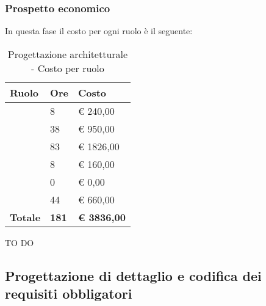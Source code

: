 		\subsubsection{Prospetto economico} %
		\label{ssub:prospetto_economico}
		In questa fase il costo per ogni ruolo è il seguente: \\
			\begin{table}[!h]
				\begin{center}
					\begin{tabularx}{0.65\textwidth}{|l|l|X|}
						\hline
						\textbf{Ruolo} & \textbf{Ore} & \textbf{Costo} \\
						\hline
						\roleProjectManager & 8 & \euro{} 240,00 \\
						\hline
						\roleAnalyst & 38 & \euro{} 950,00 \\
						\hline
						\roleDesigner & 83 & \euro{} 1826,00 \\
						\hline
						\roleAdministrator & 8 & \euro{} 160,00 \\
						\hline
						\roleProgrammer & 0 & \euro{} 0,00 \\
						\hline
						\roleVerifier & 44 & \euro{} 660,00 \\
						\hline
						\textbf{Totale} & \textbf{181} & \textbf{\euro{} 3836,00} \\
						\hline
					\end{tabularx}
				\end{center}
			\caption{Progettazione architetturale - Costo per ruolo}
			\end{table}
			
		\noindent
		TO DO	
		
	
	\subsection{Progettazione di dettaglio e codifica dei requisiti obbligatori} %
	\label{sub:progettazione_di_dettaglio_e_codifica_dei_requisiti_obbligatori}

